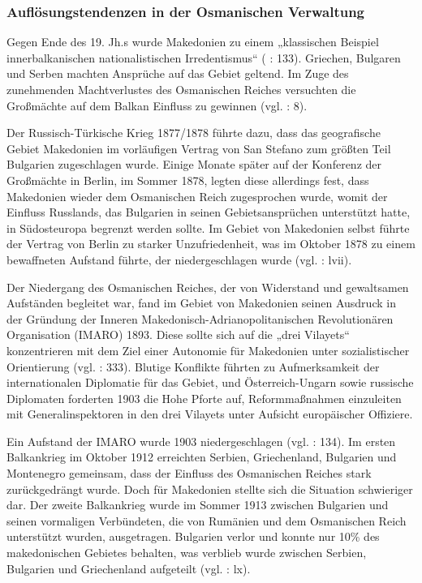 \subsubsection{Auflösungstendenzen in der Osmanischen Verwaltung}	
Gegen Ende des 19. Jh.s wurde Makedonien zu einem „klassischen Beispiel innerbalkanischen nationalistischen Irredentismus“ (\cite{tzermisa} : 133). Griechen, Bulgaren und Serben machten Ansprüche auf das Gebiet geltend. Im Zuge des zunehmenden Machtverlustes des Osmanischen Reiches versuchten die Großmächte auf dem Balkan Einfluss zu gewinnen (vgl. \cite{bark01} : 8).
\par
Der Russisch-Türkische Krieg 1877/1878 führte dazu, dass das geografische Gebiet Makedonien im vorläufigen Vertrag von San Stefano zum größten Teil Bulgarien zugeschlagen wurde. Einige Monate später auf der Konferenz der Großmächte in Berlin, im Sommer 1878, legten diese allerdings fest, dass Makedonien wieder dem Osmanischen Reich zugesprochen wurde, womit der Einfluss Russlands, das Bulgarien in seinen Gebietsansprüchen unterstützt hatte, in Südosteuropa begrenzt werden sollte. Im Gebiet von Makedonien selbst führte der Vertrag von Berlin zu starker Unzufriedenheit, was im Oktober 1878 zu einem bewaffneten Aufstand führte, der niedergeschlagen wurde (vgl. \cite{bech09} :  lvii).\par
Der Niedergang des Osmanischen Reiches, der von Widerstand und gewaltsamen Aufständen begleitet war, fand im Gebiet von Makedonien seinen Ausdruck in der Gründung der Inneren Makedonisch-Adrianopolitanischen Revolutionären Organisation (IMARO) 1893. Diese sollte sich auf die „drei Vilayets“ konzentrieren mit dem Ziel einer Autonomie für Makedonien unter sozialistischer Orientierung (vgl. \cite{boeck} : 333). Blutige Konflikte führten zu Aufmerksamkeit der internationalen Diplomatie für das Gebiet, und Österreich-Ungarn sowie russische Diplomaten forderten 1903 die Hohe Pforte auf, Reformmaßnahmen einzuleiten mit Generalinspektoren in den drei Vilayets unter Aufsicht europäischer Offiziere.\par
 Ein Aufstand der IMARO wurde 1903 niedergeschlagen (vgl. \cite{tzermisa} : 134). Im ersten Balkankrieg im Oktober 1912 erreichten Serbien, Griechenland, Bulgarien und Montenegro gemeinsam, dass der Einfluss des Osmanischen Reiches stark zurückgedrängt wurde. Doch für Makedonien stellte sich die Situation schwieriger dar. Der zweite Balkankrieg wurde im Sommer 1913 zwischen Bulgarien und seinen vormaligen Verbündeten, die von Rumänien und dem Osmanischen Reich unterstützt wurden, ausgetragen. Bulgarien verlor und konnte nur 10\% des makedonischen Gebietes behalten, was verblieb wurde zwischen Serbien, Bulgarien und Griechenland aufgeteilt (vgl. \cite{bech09} : lx).\par
